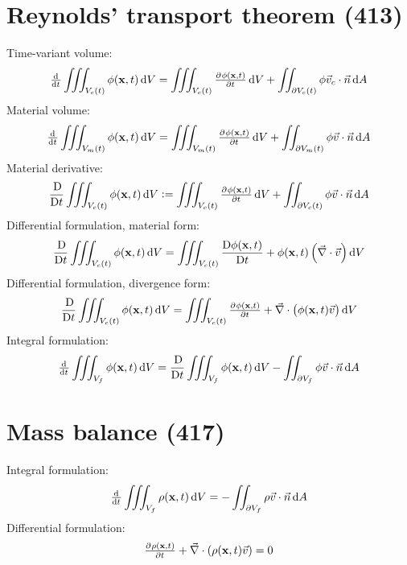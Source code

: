 \documentclass[a4paper, 12pt]{article}
\begin{document}
\section{Reynolds' transport theorem (413)}
Time-variant volume:
\begin{equation}
	\od{}{t} \iiint_{V_c(t)} \phi(\V{x}, t) \dif V
	= \iiint_{V_c(t)} \pd{\phi(\V{x}, t)}{t} \dif V
	+ \iint_{\partial V_c(t)} \phi \vec{v}_c \cdot \vec{n} \dif A
\end{equation}
Material volume:
\begin{equation}
	\od{}{t} \iiint_{V_m(t)} \phi(\V{x}, t) \dif V
	= \iiint_{V_m(t)} \pd{\phi(\V{x}, t)}{t} \dif V
	+ \iint_{\partial V_m(t)} \phi \vec{v} \cdot \vec{n} \dif A
\end{equation}
Material derivative:
\begin{equation}
	\frac{\Dif}{\Dif t} \iiint_{V_c(t)} \phi(\V{x}, t) \dif V
	:= \iiint_{V_c(t)} \pd{\phi(\V{x}, t)}{t} \dif V
	+ \iint_{\partial V_c(t)} \phi \vec{v} \cdot \vec{n} \dif A
\end{equation}
Differential formulation, material form:
\begin{equation}
	\frac{\Dif}{\Dif t} \iiint_{V_c(t)} \phi(\V{x}, t) \dif V
	= \iiint_{V_c(t)} \frac{\Dif \phi(\V{x}, t)}{\Dif t}
	+ \phi(\V{x}, t) \left( \vec{\nabla} \cdot \vec{v} \right) \dif V
\end{equation}
Differential formulation, divergence form:
\begin{equation}
	\frac{\Dif}{\Dif t} \iiint_{V_c(t)} \phi(\V{x}, t) \dif V
	= \iiint_{V_c(t)} \pd{\phi(\V{x}, t)}{t}
	+ \vec{\nabla} \cdot \left( \phi(\V{x}, t) \vec{v} \right) \dif V
\end{equation}
Integral formulation:
\begin{equation}
	\od{}{t} \iiint_{V_f} \phi(\V{x}, t) \dif V
	= \frac{\Dif}{\Dif t} \iiint_{V_f} \phi(\V{x}, t) \dif V
	- \iint_{\partial V_f} \phi \vec{v} \cdot \vec{n} \dif A
\end{equation}

\section{Mass balance (417)}
Integral formulation:
\begin{equation}
	\od{}{t} \iiint_{V_f} \rho(\V{x}, t) \dif V
	= - \iint_{\partial V_f} \rho \vec{v} \cdot \vec{n} \dif A
\end{equation}
Differential formulation:
\begin{equation}
	\pd{\rho(\V{x}, t)}{t}
	+ \vec{\nabla} \cdot ( \rho(\V{x}, t) \vec{v})	
	= 0
\end{equation}
\end{document}

